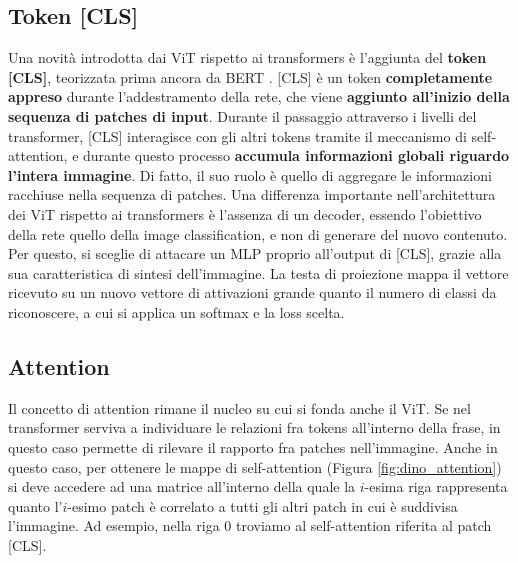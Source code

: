 \subsection{Token [CLS]}
\label{cls}
Una novità introdotta dai ViT rispetto ai transformers è l'aggiunta del \textbf{token [CLS]}, teorizzata prima ancora da BERT \cite{bert}. [CLS] è un token \textbf{completamente appreso} durante l'addestramento della rete, che viene \textbf{aggiunto all'inizio della sequenza di patches di input}. Durante il passaggio attraverso i livelli del transformer, [CLS] interagisce con gli altri tokens tramite il meccanismo di self-attention, e durante questo processo \textbf{accumula informazioni globali riguardo l'intera immagine}. Di fatto, il suo ruolo è quello di aggregare le informazioni racchiuse nella sequenza di patches. Una differenza importante nell'architettura dei ViT rispetto ai transformers è l'assenza di un decoder, essendo l'obiettivo della rete quello della image classification, e non di generare del nuovo contenuto. Per questo, si sceglie di attacare un MLP proprio all'output di [CLS], grazie alla sua caratteristica di sintesi dell'immagine. La testa di proiezione mappa il vettore ricevuto su un nuovo vettore di attivazioni grande quanto il numero di classi da riconoscere, a cui si applica un softmax e la loss scelta.

\subsection{Attention}
Il concetto di attention rimane il nucleo su cui si fonda anche il ViT. Se nel transformer serviva a individuare le relazioni fra tokens all'interno della frase, in questo caso permette di rilevare il rapporto fra patches nell'immagine. Anche in questo caso, per ottenere le mappe di self-attention (Figura \ref{fig:dino_attention}) si deve accedere ad una matrice all'interno della quale la \(i\)-esima riga rappresenta quanto l'\(i\)-esimo patch è correlato a tutti gli altri patch in cui è suddivisa l'immagine. Ad esempio, nella riga 0 troviamo al self-attention riferita al patch [CLS].

